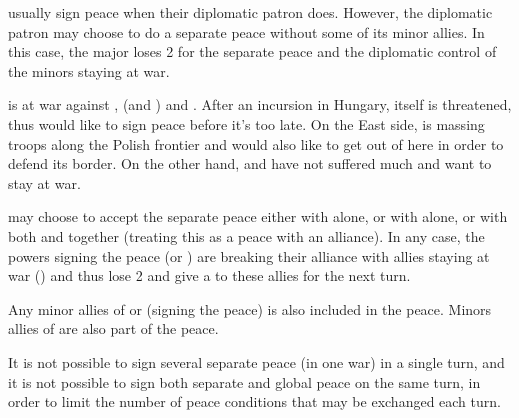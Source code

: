  usually sign peace when their diplomatic patron does.
\bparag However, the diplomatic patron may choose to do a separate peace
without some of its minor allies. In this case, the major loses 2 \STAB for
the separate peace and the diplomatic control of the minors staying at war.

\begin{exemple}
  \TUR is at war against \VEN, \HIS (and \AUS) and \POL. After an incursion in
  Hungary, \provinceVeneto itself is threatened, thus \VEN would like to sign
  peace before it's too late. On the East side, \RUS is massing troops along
  the Polish frontier and \POL would also like to get out of here in order to
  defend its border. On the other hand, \HIS and \AUS have not suffered much
  and want to stay at war.

  \TUR may choose to accept the separate peace either with \VEN alone, or with
  \POL alone, or with both \VEN and \POL together (treating this as a peace
  with an alliance). In any case, the powers signing the peace (\VEN or \POL)
  are breaking their alliance with allies staying at war (\HIS) and thus lose
  2 \STAB and give a \CB to these allies for the next turn.

  Any minor allies of \VEN or \POL (signing the peace) is also included in the
  peace. Minors allies of \TUR are also part of the peace.
\end{exemple}

\begin{designnote}
  It is not possible to sign several separate peace (in one war) in a single
  turn, and it is not possible to sign both separate and global peace on the
  same turn, in order to limit the number of peace conditions that may be
  exchanged each turn.
\end{designnote}

